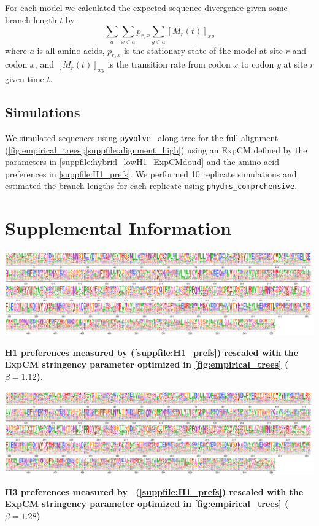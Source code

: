 \documentclass[11pt]{article}
\begin{document}
For each model we calculated the expected sequence divergence given some branch length $t$ by 
\begin{equation}
\label{eq:f}
\sum_a \sum_{x \in a} p_{r,x} \sum_{y \in a} [M_{r}\left(t\right)]_{xy}
\end{equation}
where $a$ is all amino acids, $p_{r,x}$ is the stationary state of the model at site $r$ and codon $x$, and $[M_{r}\left(t\right)]_{xy}$ is the transition rate from codon $x$ to codon $y$ at site $r$ given time $t$. 

\subsection*{Simulations}

We simulated sequences using \texttt{pyvolve}~\citep{spielman2015pyvolve} along tree for the full alignment (\ref{fig:empirical_trees};\ref{suppfile:alignment_high}) using an ExpCM defined by the parameters in \ref{suppfile:hybrid_lowH1_ExpCMdoud} and the amino-acid preferences in \ref{suppfile:H1_prefs}. 
We performed 10 replicate simulations and estimated the branch lengths for each replicate using \texttt{phydms\_comprehensive}. 

\newpage
\section*{Supplemental Information}

\begin{suppfig}[H]
\centerline{\includegraphics[width=\textwidth]{figures/prefs_doud}}
\caption{\label{suppfig:prefs_doud}
\textbf{H1 preferences measured by \cite{doud2016accurate} (\ref{suppfile:H1_prefs}) rescaled with the ExpCM stringency parameter optimized in \ref{fig:empirical_trees}  ($\beta = 1.12$)}. 
}
\end{suppfig}

\begin{suppfig}[H]
\centerline{\includegraphics[width=\textwidth]{figures/prefs_lee}}
\caption{\label{suppfig:prefs_lee}
\textbf{H3 preferences measured by~\citet{lee2018deep} (\ref{suppfile:H1_prefs}) rescaled with the ExpCM stringency parameter optimized in \ref{fig:empirical_trees}  ($\beta = 1.28$)}
 }
\end{suppfig}
\end{document}
